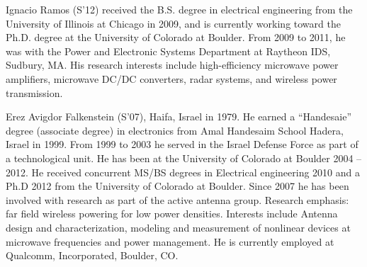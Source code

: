 \begin{IEEEbiography}{Ignacio Ramos}
(S'12) received the B.S. degree in electrical engineering from the University of Illinois at Chicago in 2009, and is currently working toward the Ph.D. degree at the University of Colorado at Boulder. From 2009 to 2011, he was with the Power and Electronic Systems Department at Raytheon IDS, Sudbury, MA. His research interests include high-efficiency microwave power amplifiers, microwave DC/DC converters, radar systems, and wireless power transmission.
\end{IEEEbiography}
\begin{IEEEbiography}{Erez Avigdor Falkenstein}
(S'07), Haifa, Israel in 1979. He earned a “Handesaie” degree (associate degree) in electronics from Amal Handesaim School Hadera, Israel in 1999. From 1999 to 2003 he served in the Israel Defense Force as part of a technological unit. He has been at the University of Colorado at Boulder 2004 – 2012. He received concurrent MS/BS degrees in Electrical engineering 2010 and a Ph.D 2012 from the University of Colorado at Boulder. Since 2007 he has been involved with research as part of the active antenna group. Research emphasis: far field wireless powering for low power densities. Interests include Antenna design and characterization, modeling and measurement of nonlinear devices at microwave frequencies and power management. He is currently employed at Qualcomm, Incorporated, Boulder, CO.
\end{IEEEbiography}
